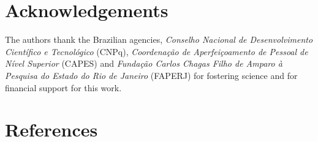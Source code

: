 \documentclass[12pt]{CHT-20}
\begin{document}
\section*{Acknowledgements}

The authors thank the Brazilian agencies, \textit{Conselho Nacional de Desenvolvimento Científico e Tecnológico} (CNPq), \textit{Coordenação de Aperfeiçoamento de Pessoal de Nível Superior} (CAPES) and \textit{Fundação Carlos Chagas Filho de Amparo à Pesquisa do Estado do Rio de Janeiro} (FAPERJ) for fostering science and for financial support for this work.

\section*{References}



 
\end{document}

